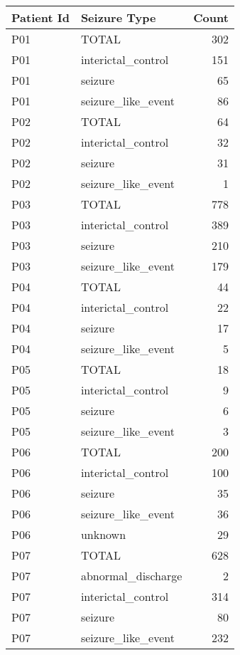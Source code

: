 \begin{table}[htbp]
\centering
\small
\setlength{\tabcolsep}{6pt}
\begin{tabular}{llr}
\toprule
\textbf{Patient Id} & \textbf{Seizure Type} & \textbf{Count} \\
\midrule
P01 & TOTAL & 302 \\
\rowcolor{gray!10}
P01 & interictal\_control & 151 \\
P01 & seizure & 65 \\
\rowcolor{gray!10}
P01 & seizure\_like\_event & 86 \\
P02 & TOTAL & 64 \\
\rowcolor{gray!10}
P02 & interictal\_control & 32 \\
P02 & seizure & 31 \\
\rowcolor{gray!10}
P02 & seizure\_like\_event & 1 \\
P03 & TOTAL & 778 \\
\rowcolor{gray!10}
P03 & interictal\_control & 389 \\
P03 & seizure & 210 \\
\rowcolor{gray!10}
P03 & seizure\_like\_event & 179 \\
P04 & TOTAL & 44 \\
\rowcolor{gray!10}
P04 & interictal\_control & 22 \\
P04 & seizure & 17 \\
\rowcolor{gray!10}
P04 & seizure\_like\_event & 5 \\
P05 & TOTAL & 18 \\
\rowcolor{gray!10}
P05 & interictal\_control & 9 \\
P05 & seizure & 6 \\
\rowcolor{gray!10}
P05 & seizure\_like\_event & 3 \\
P06 & TOTAL & 200 \\
\rowcolor{gray!10}
P06 & interictal\_control & 100 \\
P06 & seizure & 35 \\
\rowcolor{gray!10}
P06 & seizure\_like\_event & 36 \\
P06 & unknown & 29 \\
\rowcolor{gray!10}
P07 & TOTAL & 628 \\
P07 & abnormal\_discharge & 2 \\
\rowcolor{gray!10}
P07 & interictal\_control & 314 \\
P07 & seizure & 80 \\
\rowcolor{gray!10}
P07 & seizure\_like\_event & 232 \\

\end{tabular}
\end{table}
